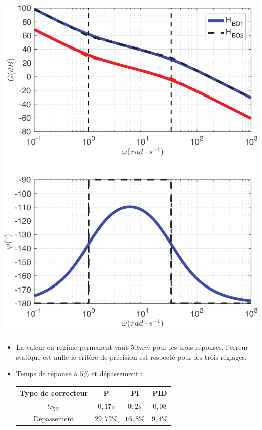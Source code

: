 \documentclass[10pt,fleqn]{article} %
\begin{document}
\begin{multicols}{2}
\begin{center}
\includegraphics[width=.80\linewidth]{images/matlab/bode_total3.pdf}
\end{center} 


\subparagraph{}\textit{}%

\begin{itemize}
\item La valeur en régime permanent vaut $50mm$ pour les trois réponses, l'erreur statique est nulle le critère de précision
est respecté pour les trois réglages.

\item Temps de réponse à $5\%$ et dépassement : 

\begin{tabular}{|c|c|c|c|}
\hline 
Type de correcteur & \textbf{P} & \textbf{PI} & \textbf{PID} \\ 
\hline 
$tr_{5\%}$ & $0,17s$ & $0,2s$ & $0,08$ \\ 
\hline 
Dépassement & $29,72\%$ & $16,8\%$ & $9,4\%$ \\ 
\hline 
\end{tabular} 


\end{itemize}
\end{multicols}
\end{document}
